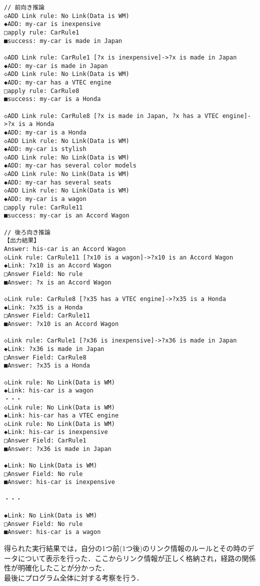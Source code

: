 \documentclass[12pt]{jarticle}
\begin{document}
\begin{lstlisting}[caption=実装方法変更後の実行結果,label=changekekka]
// 前向き推論
◇ADD Link rule: No Link(Data is WM)
◆ADD: my-car is inexpensive
□apply rule: CarRule1
■success: my-car is made in Japan

◇ADD Link rule: CarRule1 [?x is inexpensive]->?x is made in Japan
◆ADD: my-car is made in Japan
◇ADD Link rule: No Link(Data is WM)
◆ADD: my-car has a VTEC engine
□apply rule: CarRule8
■success: my-car is a Honda

◇ADD Link rule: CarRule8 [?x is made in Japan, ?x has a VTEC engine]->?x is a Honda
◆ADD: my-car is a Honda
◇ADD Link rule: No Link(Data is WM)
◆ADD: my-car is stylish
◇ADD Link rule: No Link(Data is WM)
◆ADD: my-car has several color models
◇ADD Link rule: No Link(Data is WM)
◆ADD: my-car has several seats
◇ADD Link rule: No Link(Data is WM)
◆ADD: my-car is a wagon
□apply rule: CarRule11
■success: my-car is an Accord Wagon

// 後ろ向き推論
【出力結果】
Answer: his-car is an Accord Wagon
◇Link rule: CarRule11 [?x10 is a wagon]->?x10 is an Accord Wagon
◆Link: ?x10 is an Accord Wagon
□Answer Field: No rule
■Answer: ?x is an Accord Wagon

◇Link rule: CarRule8 [?x35 has a VTEC engine]->?x35 is a Honda
◆Link: ?x35 is a Honda
□Answer Field: CarRule11
■Answer: ?x10 is an Accord Wagon

◇Link rule: CarRule1 [?x36 is inexpensive]->?x36 is made in Japan
◆Link: ?x36 is made in Japan
□Answer Field: CarRule8
■Answer: ?x35 is a Honda

◇Link rule: No Link(Data is WM)
◆Link: his-car is a wagon
・・・
◇Link rule: No Link(Data is WM)
◆Link: his-car has a VTEC engine
◇Link rule: No Link(Data is WM)
◆Link: his-car is inexpensive
□Answer Field: CarRule1
■Answer: ?x36 is made in Japan

◆Link: No Link(Data is WM)
□Answer Field: No rule
■Answer: his-car is inexpensive

・・・

◆Link: No Link(Data is WM)
□Answer Field: No rule
■Answer: his-car is a wagon
\end{lstlisting}
得られた実行結果では，自分の1つ前(1つ後)のリンク情報のルールとその時のデータについて表示を行った．ここからリンク情報が正しく格納され，経路の関係性が明確化したことが分かった．\\

最後にプログラム全体に対する考察を行う．\\
\end{document}
